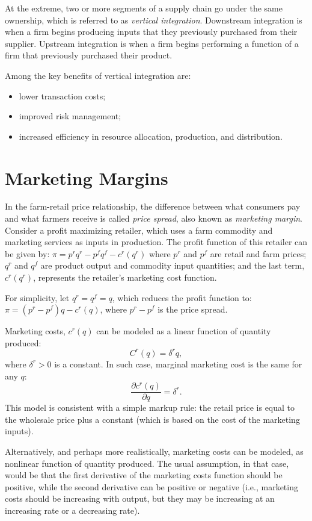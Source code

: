 \documentclass[
  oneside]{book}
\providecommand{\tightlist}{%
  \setlength{\itemsep}{0pt}\setlength{\parskip}{0pt}}
\begin{document}
At the extreme, two or more segments of a supply chain go under the same ownership, which is referred to as \emph{vertical integration}. Downstream integration is when a firm begins producing inputs that they previously purchased from their supplier. Upstream integration is when a firm begins performing a function of a firm that previously purchased their product.

Among the key benefits of vertical integration are:

\begin{itemize}
\tightlist
\item
  lower transaction costs;
\item
  improved risk management;
\item
  increased efficiency in resource allocation, production, and distribution.
\end{itemize}

\hypertarget{marketing-margins}{%
\section{Marketing Margins}\label{marketing-margins}}

In the farm-retail price relationship, the difference between what consumers pay and what farmers receive is called \emph{price spread}, also known as \emph{marketing margin}. Consider a profit maximizing retailer, which uses a farm commodity and marketing services as inputs in production. The profit function of this retailer can be given by: \(\pi = p^r q^r - p^f q^f - c^r(q^r)\) where \(p^r\) and \(p^f\) are retail and farm prices; \(q^r\) and \(q^f\) are product output and commodity input quantities; and the last term, \(c^r(q^r)\), represents the retailer's marketing cost function.

For simplicity, let \(q^r=q^f=q\), which reduces the profit function to: \(\pi = (p^r - p^f) q - c^r(q)\), where \(p^r - p^f\) is the price spread.

Marketing costs, \(c^r(q)\) can be modeled as a linear function of quantity produced: \[C^r(q) = \delta^r q,\] where \(\delta^r > 0\) is a constant. In such case, marginal marketing cost is the same for any \(q\): \[\frac{\partial c^r(q)}{\partial q} = \delta^r.\] This model is consistent with a simple markup rule: the retail price is equal to the wholesale price plus a constant (which is based on the cost of the marketing inputs).

Alternatively, and perhaps more realistically, marketing costs can be modeled, as nonlinear function of quantity produced. The usual assumption, in that case, would be that the first derivative of the marketing costs function should be positive, while the second derivative can be positive or negative (i.e., marketing costs should be increasing with output, but they may be increasing at an increasing rate or a decreasing rate).
\end{document}
